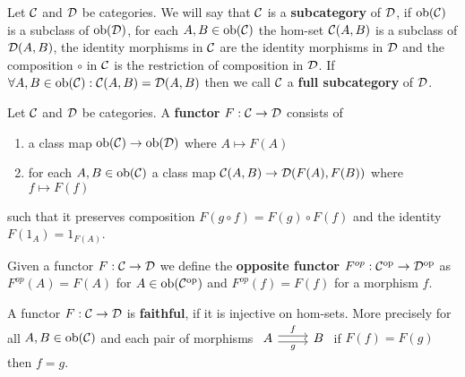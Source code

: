 \begin{definition}
        Let $\mathcal{C}$ and $\mathcal{D}$ be categories. We will say that $\mathcal{C}$ is a \textbf{subcategory} of $\mathcal{D}$, if 
        $\text{ob}(\mathcal{C})$ is a subclass of $\text{ob}(\mathcal{D})$, for each $A,B\in\text{ob}(\mathcal{C})$ the hom-set
        $\mathcal{C}(A,B)$ is a subclass of $\mathcal{D}(A,B)$, the identity morphisms in $\mathcal{C}$ are 
        the identity morphisms in $\mathcal{D}$ and the composition $\circ$ in $\mathcal{C}$ is the restriction of composition in $\mathcal{D}$.
        If $\forall A,B\in\text{ob}(\mathcal{C}) : \mathcal{C}(A,B) = \mathcal{D}(A,B)$
        then we call $\mathcal{C}$ a \textbf{full subcategory} of $\mathcal{D}$.    
\end{definition}
\begin{definition}
    Let $\mathcal{C}$ and $\mathcal{D}$ be categories. A \textbf{functor} $F: \mathcal{C} \to \mathcal{D}$ consists of 
    \begin{enumerate}
        \item a class map $\text{ob}(\mathcal{C})\to\text{ob}(\mathcal{D})$ where $A \mapsto F(A)$
        \item for each $A,B\in\text{ob}(\mathcal{C})$ a class map $\mathcal{C}(A,B)\to\mathcal{D}(F(A),F(B))$ where $f \mapsto F(f)$
    \end{enumerate}
    such that it preserves composition $F(g\circ f) = F(g)\circ F(f)$ and the identity $F(1_A) = 1_{F(A)}$.\par
    Given a functor $F: \mathcal{C}\to\mathcal{D}$ we define the \textbf{opposite functor} $F^{op}: \mathcal{C}^{\text{op}}\to\mathcal{D}^{\text{op}}$ as 
    $F^{op}(A) = F(A)$ for $A\in\text{ob}(\mathcal{C}^{\text{op}})$ and $F^{op}(f)=F(f)$ for a morphism $f$.\par
    A functor $F:\mathcal{C}\to\mathcal{D}$ is \textbf{faithful}, if it is injective on hom-sets.
    More precisely for all $A,B\in\text{ob}(\mathcal{C})$ and each pair of morphisms $\begin{tikzcd}
        A & B
        \arrow["g"', shift right, from=1-1, to=1-2]
        \arrow["f", shift left, from=1-1, to=1-2]
    \end{tikzcd}$ if $F(f)=F(g)$ then $f=g$.\\ 
\end{definition}
